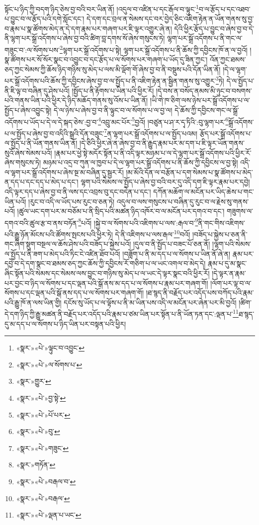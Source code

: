 སྟོང་པ་ཉིད་ཀྱི་བདག་ཉིད་ཅེས་བྱ་བའི་བར་ཡིན་ནོ། །འདུལ་བ་འཛིན་པ་དང་རྒོལ་བ་ལྟུང་\footnote{«སྣར་»«པེ་»ལྟུང་བ་འབྱུང་}བ་ལ་རྩོད་པ་དང་འཐབ་པ་བྱུང་བ་ལ་རྩོད་པའི་དགེ་སློང་དང་། དེ་དག་དང་བྲལ་ན་སེམས་དང་བར་བྱེད་ཅིང་འཇིག་རྟེན་ན་ཡོན་གནས་སུ་བྱ་བ་རྣམ་པ་སྣ་ཚོགས་མེད་ན་དེ་དག་རྣམ་པར་གཞག་པར་ཇི་ལྟར་འགྱུར་ཞེ་ན། དེའི་ཕྱིར་རྩོད་པ་བྱུང་བ་ཞེས་བྱ་བ་དེ་ནི་ལྷག་པར་སྒྲོ་འདོགས་པ་ཞེས་བྱ་བའི་ཚིག་བླ་དགས་སོ་ཞེས་གསུངས་ཏེ། ལྷག་པར་སྒྲོ་འདོགས་པ་ནི་གང་ལ་གཟུང་བ་:ལ་སོགས་པས་\footnote{«སྣར་»«པེ་»ལ་སོགས་པ་}ལྷག་པར་སྒྲོ་འདོགས་པ་སྟེ། ལྷག་པར་སྒྲོ་འདོགས་པ་ནི་ཆོས་ཀྱི་དབྱིངས་ཁོ་ན་ལ་བྱའོ། །སྣ་ཚོགས་པར་སོ་སོར་སྣང་བ་འབྱུང་བ་དང་རྩོད་པ་ལ་སོགས་པར་གཞག་པ་ཡོད་དུ་ཟིན་ཀྱང་། འོན་ཀྱང་ཐམས་ཅད་ཀྱང་སེམས་ཀྱི་ཆོས་ཉིད་གཉིས་སུ་མེད་པ་ལས་མི་ལྡོག་གོ་ཞེས་བྱ་བ་ནི་བསྡུས་པའི་དོན་ཡིན་ནོ། །དེ་ལ་ལྷག་པར་སྒྲོ་འདོགས་པའི་ཆོས་ཀྱི་དབྱིངས་ཞེས་བྱ་བ་ལ་སྤྱོད་པ་ནི་འཇིག་རྟེན་ན་སྦྱིན་གནས་སུ་འགྱུར་\footnote{«སྣར་»གྱུར་}ཏེ། དེ་ལ་སྤྱོད་པ་ནི་ཇི་ལྟ་བ་བཞིན་དུ་ཤེས་པའོ། །སྤྱོད་པ་ནི་རྟོགས་པ་ཡིན་པའི་ཕྱིར་རོ། །དེ་བས་ན་བསོད་ནམས་མི་ཉུང་བ་བསགས་པའི་གནས་ཡིན་པའི་ཕྱིར་དེ་ཉིད་མཆོད་གནས་སུ་འོས་པ་ཡིན་ནོ། །ཡི་གེ་ཁ་ཅིག་ལས་ཉེས་པར་སྒྲོ་འདོགས་པ་ལ་སྤྱོད་པ་ཞེས་འབྱུང་སྟེ། དེ་ལ་ཉེས་པ་ཞེས་བྱ་བ་ནི་ལྟུང་བ་ལ་སོགས་པ་ལ་བྱ་ལ། དེ་ཆོས་ཀྱི་དབྱིངས་གང་ལ་སྒྲོ་འདོགས་པ་ཡོད་པ་དེ་ལ་དེ་སྐད་ཅེས་:བྱ་བ་\footnote{«སྣར་»«པེ་»བྱ་སྟེ་}འབྲུ་མང་པོར་\footnote{«སྣར་»«པེ་»པོ་པར་}བྱའོ། །བཙུན་པ་ཤ་ར་དྭ་ཏིའི་:བུ་ལྷག་པར་\footnote{«སྣར་»«པེ་»བུ་}སྒྲོ་འདོགས་པ་ལ་སྤྱོད་པ་ཞེས་བྱ་བ་འདིའི་སྒྲའི་དོན་བཟུང་\footnote{«སྣར་»«པེ་»གཟུང་}ན་ལྷག་པར་སྒྲོ་འདོགས་པ་ལ་སྤྱོད་པའམ། རྩོད་པར་སྒྲོ་འདོགས་པ་ལ་སྤྱོད་པ་ནི་ཡོན་གནས་ཡིན་ནོ། །དེ་ཅིའི་ཕྱིར་ཞེ་ན་ཞེས་བྱ་བ་ནི་རྒྱུད་རྣམ་པར་མ་དག་པ་ཇི་ལྟར་ཡོན་གནས་སུའོ་ཞེས་སེམས་པའོ། །རྣམ་པར་ཕྱེ་སྟེ་མདོར་སྟོན་པ་ནི་འདི་ལྟར་མཉམ་པ་ལ་དེ་ལྷག་པར་སྒྲོ་འདོགས་པའི་ཕྱིར་རོ་ཞེས་གསུངས་ཏེ། མཉམ་པ་འདྲ་བ་ཀུན་ལ་ཁྱབ་པ་དེ་ལ་ལྷག་པར་སྒྲོ་འདོགས་པ་ནི་ཆོས་ཀྱི་དབྱིངས་ལ་བྱ་སྟེ། འདི་ལ་ལྷག་པར་སྒྲོ་འདོགས་པ་ཞེས་སྔ་མ་བཞིན་དུ་སྦྱར་རོ། །མ་མོའི་དོན་ལ་བརྩོན་པ་དག་སེམས་པ་སྣ་ཚོགས་པ་མེད་ན་དད་པ་དང་དད་པ་མེད་པ་དང་། ལྷག་པའི་སེམས་ལ་སྤྱོད་པ་ཞེས་བྱ་བའི་བར་དུ་འདི་དག་ཇི་ལྟར་རྣམ་པར་དབྱེ། འདི་ལྟར་དད་པ་ཞེས་བྱ་བ་ནི་ལས་དང་འབྲས་བུ་དང་བདེན་པ་དང་། དཀོན་མཆོག་ལ་མངོན་པར་ཡིད་ཆེས་པ་གང་ཡིན་པའོ། །རུང་བ་འདི་ལ་ཡོད་པས་རུང་བ་ཅན་ཏེ། འདུལ་བ་ལས་གསུངས་པ་བཞིན་དུ་རུང་བ་ལ་རྗེས་སུ་གནས་པའོ། །ཚུལ་ཡང་དག་པར་མ་བཅོམ་པ་ནི་སྲིད་པའི་མཚན་ཉིད་འཁོར་བ་ལ་མངོན་པར་དགའ་བ་དང་། གཟུགས་ལ་དགའ་བའི་ཚུལ་རྩ་བ་ནས་བཏོན་\footnote{«སྣར་»གཏོན་}པའོ། །སྐྱེ་བ་ལ་སོགས་པའི་འཇིགས་པ་ལས་:རྒལ་བ་\footnote{«སྣར་»«པེ་»བརྒལ་བ་}ནི་གང་གིས་འཇིགས་པའི་རྒྱུ་ཉོན་མོངས་པའི་ཚོགས་སྤངས་པའི་ཕྱིར་ཏེ། དེ་ནི་འཇིགས་པ་ལས་རྒལ་\footnote{«སྣར་»«པེ་»བརྒལ་}བའོ། །བཟོད་པ་སྐྱེས་པ་ཅན་ནི་གང་ཞིག་སྡུག་བསྔལ་ལ་ཆོས་ཤེས་པའི་བཟོད་པ་སྐྱེས་པའོ། །དུལ་བ་ནི་སྤྱོད་པ་བཟང་པོ་ཅན་ནོ། །ལྷག་པའི་སེམས་ལ་སྤྱོད་པ་ནི་ཟག་པ་མེད་པའི་ཏིང་ངེ་འཛིན་ཐོབ་པའོ། །བཟློག་པ་ནི་མ་དད་པ་ལ་སོགས་པ་ཡིན་ནོ་ཞེ་ན། རྣམ་པར་དབྱེ་བ་དེ་དག་སྣང་བ་ཐམས་ཅད་ཀྱང་ཆོས་ཀྱི་དབྱིངས་རོ་གཅིག་པ་ལ་ཡང་འགལ་བ་མེད་དེ། རྣམ་པ་དུ་མ་སྣང་ཞིང་སྟོན་པའི་སེམས་དང་སེམས་ལས་བྱུང་བ་གཉིས་སུ་མེད་པ་ལ་ཡང་དེ་ལྟར་སྣང་བའི་ཕྱིར་རོ། །དེ་ལྟར་ན་རྣམ་པར་བྱང་བ་ཉིད་ལ་སོགས་པ་དང་ལྡན་པའི་སྒོ་ནས་མ་དད་པ་ལ་སོགས་པ་རྣམ་པར་གཞག་གོ། །ལོག་པར་ལྟ་བ་ལ་སོགས་པ་དང་ལྡན་པའི་སྒོ་ནས་དད་པ་ལ་སོགས་པར་གཞག་གོ། །ཐ་སྙད་ནི་བརྗོད་པར་འདོད་པས་བཀོད་པའི་རྣམ་པའི་རྒྱུ་ཁོ་ན་ལས་ཡིན་གྱི། དངོས་སུ་ཡོད་པ་ལ་ལྟོས་པ་ནི་མ་ཡིན་པས་འདི་ལ་མངོན་པར་ཞེན་པར་མི་བྱའོ། །ཚིག་དེ་དག་ཉིད་ཀྱི་རྒྱུ་མཚན་ནི་བརྗོད་པར་འདོད་པའི་རྣམ་པ་ཙམ་ཡིན་པར་སྟོན་པ་ནི་ཡོན་ཏན་དང་:ལྡན་པ་\footnote{«སྣར་»«པེ་»ལྡན་པ་ཡང་}ཐ་སྙད་དུ་མ་དད་པ་ལ་སོགས་པ་ཉིད་ཡིན་པར་བསྟན་པའི་ཕྱིར། 